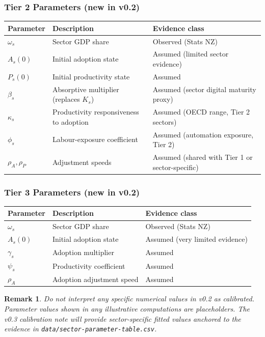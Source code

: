 \documentclass[11pt,a4paper]{article}
\newtheorem{remark}{Remark}
\begin{document}
\subsubsection*{Tier 2 Parameters (new in v0.2)}

\begin{center}
\begin{tabular}{lll}
\toprule
Parameter & Description & Evidence class \\
\midrule
$\omega_s$ & Sector GDP share & Observed (Stats NZ) \\
$A_s(0)$ & Initial adoption state & Assumed (limited sector evidence) \\
$P_s(0)$ & Initial productivity state & Assumed \\
$\beta_s$ & Absorptive multiplier (replaces $K_s$) & Assumed (sector digital maturity proxy) \\
$\kappa_s$ & Productivity responsiveness to adoption & Assumed (OECD range, Tier 2 sectors) \\
$\phi_s$ & Labour-exposure coefficient & Assumed (automation exposure, Tier 2) \\
$\rho_A, \rho_P$ & Adjustment speeds & Assumed (shared with Tier 1 or sector-specific) \\
\bottomrule
\end{tabular}
\end{center}

\subsubsection*{Tier 3 Parameters (new in v0.2)}

\begin{center}
\begin{tabular}{lll}
\toprule
Parameter & Description & Evidence class \\
\midrule
$\omega_s$ & Sector GDP share & Observed (Stats NZ) \\
$A_s(0)$ & Initial adoption state & Assumed (very limited evidence) \\
$\gamma_s$ & Adoption multiplier & Assumed \\
$\psi_s$ & Productivity coefficient & Assumed \\
$\rho_A$ & Adoption adjustment speed & Assumed \\
\bottomrule
\end{tabular}
\end{center}

\begin{remark}
Do not interpret any specific numerical values in v0.2 as calibrated. Parameter values shown in any illustrative computations are placeholders. The v0.3 calibration note will provide sector-specific fitted values anchored to the evidence in \texttt{data/sector-parameter-table.csv}.
\end{remark}
\end{document}
